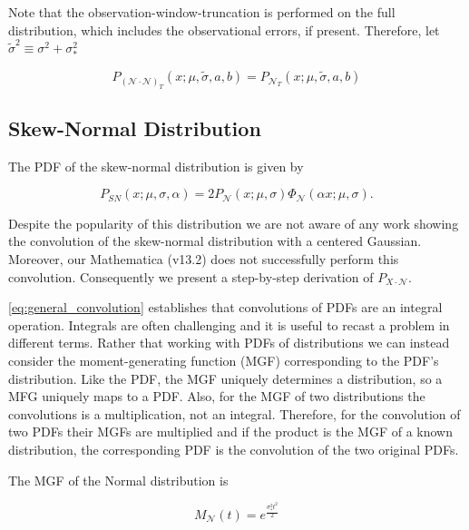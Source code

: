 \documentclass[twocolumn]{aastex631}
\newcommand{\mcal}[1]{\mathcal{#1}}
\newcommand{\pdf}{P}
\newcommand{\cdf}{\Phi}
\newcommand{\Exp}[1]{e^{#1}}
\begin{document}
        Note that the observation-window-truncation is performed on the full distribution, which includes the observational errors, if present.
        Therefore, let $\tilde{\sigma}^2 \equiv \sigma^2+\sigma_*^2$

        \begin{equation}
            P_{(\mcal{N}\cdot\mcal{N})_T}(x; \mu, \tilde{\sigma}, a, b) = P_{\mcal{N}_T}(x; \mu, \tilde{\sigma}, a, b)
        \end{equation}

    \vspace{10pt}
    \subsection{Skew-Normal Distribution}

        The PDF of the skew-normal distribution is given by

        \begin{equation}
            \pdf_{SN}(x;\mu,\sigma,\alpha) = 2\pdf_{\mcal{N}}(x;\mu,\sigma)\cdf_{\mcal{N}}(\alpha x;\mu,\sigma).
        \end{equation}

        Despite the popularity of this distribution we are not aware of any work showing the convolution of the skew-normal distribution with a centered Gaussian. Moreover, our Mathematica (v13.2) does not successfully perform this convolution. Consequently we present a step-by-step derivation of $P_{X\cdot\mcal{N}}$.

        \autoref{eq:general_convolution} establishes that convolutions of PDFs are an integral operation. Integrals are often challenging and it is useful to recast a problem in different terms. Rather that working with PDFs of distributions we can instead consider the moment-generating function (MGF) corresponding to the PDF's distribution. Like the PDF, the MGF uniquely determines a distribution, so a MFG uniquely maps to a PDF. Also, 
        for the MGF of two distributions the convolutions is a multiplication, not an integral.
        Therefore, for the convolution of two PDFs their MGFs are multiplied and if the product is the MGF of a known distribution, the corresponding PDF is the convolution of the two original PDFs.

        The MGF of the Normal distribution is

        \begin{equation} \label{eq:mgf_normal}
            M_{\mcal{N}}(t) = \Exp{\frac{\sigma_*^2 t^2}{2}}
        \end{equation}
\end{document}
